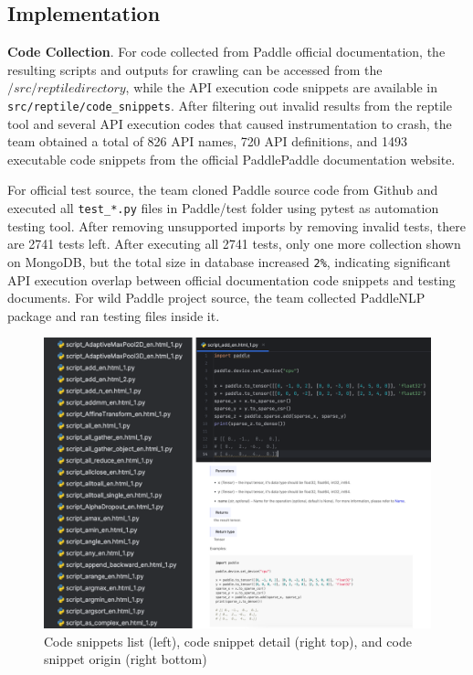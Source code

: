 \documentclass[sigconf]{acmart}
\begin{document}
  \subsection{Implementation}
  \textbf{Code Collection}. For code collected from Paddle official documentation, 
  the resulting scripts and outputs for crawling can be accessed from the $/src/reptile directory$, 
  while the API execution code snippets are available in \verb|src/reptile/code_snippets|. 
  After filtering out invalid results from the reptile tool and several API execution codes that caused instrumentation to crash, 
  the team obtained a total of 826 API names, 720 API definitions, and 1493 executable code snippets from the official PaddlePaddle documentation website.
  \par For official test source, the team cloned Paddle source code from Github and executed all \verb|test_*.py| files in Paddle/test folder using pytest as automation testing tool. 
  After removing unsupported imports by removing invalid tests, there are 2741 tests left. After executing all 2741 tests, only one more collection shown on MongoDB, 
  but the total size in database increased  \verb|2%|, indicating significant API execution overlap between official documentation code snippets and testing documents.
  For wild Paddle project source, the team collected PaddleNLP package and ran testing files inside it.
  
  \begin{figure}[h]
    \centering
    \includegraphics[width=\linewidth]{2.png}
    \caption{Code snippets list (left), code snippet detail (right top), and code snippet origin (right bottom)}
  \end{figure}  
\end{document}
